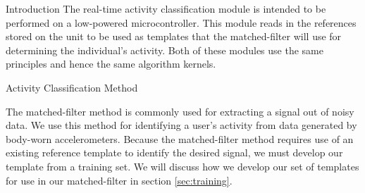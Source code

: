 \documentclass[unknownkeysallowed,final]{beamer}
\begin{document}
\begin{frame}{}
\begin{textblock}{19.5}
\begin{block}{\small{Introduction}}
The real-time activity classification module is intended to be performed on a low-powered microcontroller.
This module reads in the references stored on the unit to be used as templates that the matched-filter will use for determining the individual's activity.
Both of these modules use the same principles and hence the same algorithm kernels.
\end{block}

\begin{block}{\small{Activity Classification Method}}

The matched-filter method is commonly used for extracting a signal out of noisy data.
We use this method for identifying a user's activity from data generated by body-worn accelerometers.
Because the matched-filter method requires use of an existing reference template to identify the desired signal, we must develop our template from a training set.
We will discuss how we develop our set of templates for use in our matched-filter in section \ref{sec:training}.


\end{block}
\end{textblock}
\end{frame}
\end{document}
